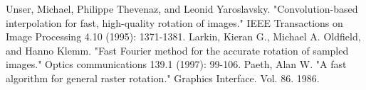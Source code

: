 \begin{thebibliography}{2}

  Unser, Michael, Philippe Thevenaz, and Leonid Yaroslavsky. 
  "Convolution-based interpolation for fast, high-quality rotation of images." 
  IEEE Transactions on Image Processing 4.10 (1995): 1371-1381.
  Larkin, Kieran G., Michael A. Oldfield, and Hanno Klemm. 
  "Fast Fourier method for the accurate rotation of sampled images." 
  Optics communications 139.1 (1997): 99-106.
	Paeth, Alan W. 
	"A fast algorithm for general raster rotation." 
	Graphics Interface. Vol. 86. 1986.

\end{thebibliography}


